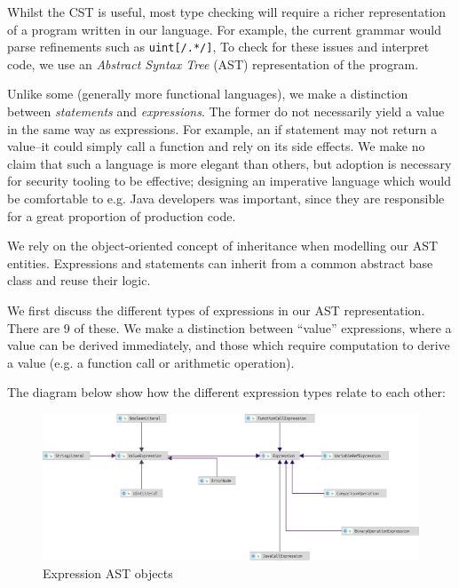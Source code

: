 \documentclass[a4paper,openany,12pt]{book}
\begin{document}
Whilst the CST is useful, most type checking will require a richer representation of a program written in our language.
For example, the current grammar would parse refinements such as \textcolor{id7-ruby-red}{\texttt{uint}}\texttt{[/.*/]},
To check for these issues and interpret code, we use an \emph{Abstract Syntax Tree} (AST) representation of the program.

Unlike some (generally more functional languages), we make a distinction between \textit{statements} and
\textit{expressions}.
The former do not necessarily yield a value in the same way as expressions.
For example, an if statement may not return a value--it could simply call a function and rely on its side effects.
We make no claim that such a language is more elegant than others, but adoption is necessary for security tooling
to be effective; designing an imperative language which would be comfortable to e.g. Java developers was important,
since they are responsible for a great proportion of production code.

We rely on the object-oriented concept of inheritance when modelling our AST entities.
Expressions and statements can inherit from a common abstract base class and reuse their logic.

We first discuss the different types of expressions in our AST representation.
There are 9 of these.
We make a distinction between ``value'' expressions, where a value can be derived immediately, and those which require
computation to derive a value (e.g. a function call or arithmetic operation).

The diagram below show how the different expression types relate to each other:

\begin{figure}[H]
    \begin{MyMdframed}
        \vspace{0.5em}

        \caption{\label{figure:ast:expressions}Expression AST objects}
        \vspace{0.5em}
        \captionsetup{style=default}

        \centering \includegraphics[width=0.9\linewidth]{expressions.eps}
    \end{MyMdframed}
\end{figure}
\end{document}

